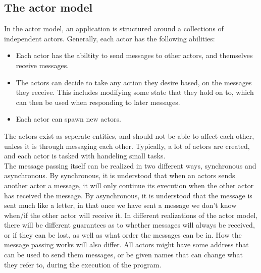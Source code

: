 \documentclass[a4paper]{article}
\begin{document}


\subsection{The actor model}
In the actor model, an application is structured around a collections of
independent actors. Generally, each actor has the following abilities:
\begin{itemize}
\item Each actor has the abiltity to send messages to other actors, and
  themselves receive messages.
\item The actors can decide to take any action they desire based, on the messages
  they receive. This includes modifying some state that they hold on to, which
  can then be used when responding to later messages.
\item Each actor can spawn new actors.
\end{itemize}

The actors exist as seperate entities, and should not be able to affect each
other, unless it is through messaging each other. Typically, a lot of actors are
created, and each actor is tasked with handeling small tasks.\\

\noindent
The message passing itself can be realized in two different ways, synchronous
and asynchronous. By synchronous, it is understood that when an actors sends
another actor a message, it will only continue its execution when the other
actor has received the message. By asynchronous, it is understood that the
message is sent much like a letter, in that once we have sent a message we don't
know when/if the other actor will receive it. In different realizations of the
actor model, there will be different guarantees as to whether messages will
always be received, or if they can be lost, as well as what order the messages
can be in. How the message passing works will also differ. All actors might have
some address that can be used to send them messages, or be given names that can
change what they refer to, during the execution of the program.
\end{document}
